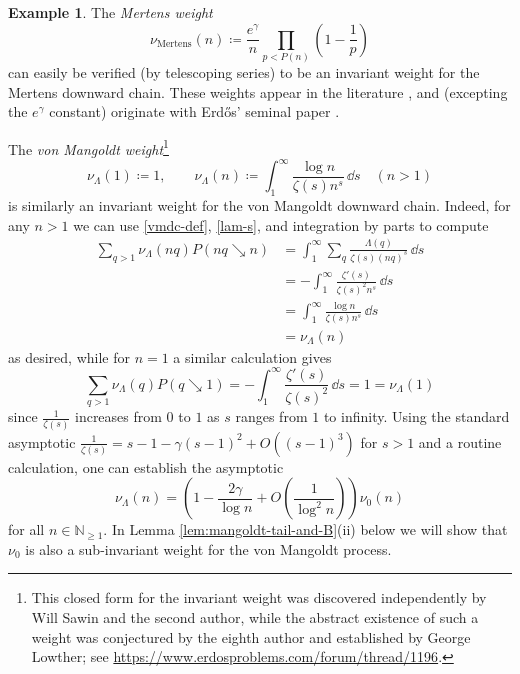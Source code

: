 \documentclass[12pt]{amsart}
\theoremstyle{definition}
\newtheorem{example}[theorem]{Example}
\theoremstyle{remark}
\numberwithin{equation}{section}
\newcommand{\N}{{\mathbb N}}
\newcommand{\nuMangoldt}{\nu_{\Lambda}}
\newcommand{\1}{{\mathbf 1}}
\newcommand{\Erdos}{{Erd\H{o}s}}
\begin{document}
\begin{example}\label{invariants}  The \emph{Mertens weight}
$$ \nu_{\mathrm{Mertens}}(n) \coloneq \frac{e^\gamma}{n} \prod_{p < P(n)} \left(1-\frac{1}{p}\right)$$
can easily be verified (by telescoping series) to be an invariant weight for the Mertens downward chain. These weights appear in the literature \cite{LP, Lichtman, Lalmost,glw}, and (excepting the $e^\gamma$ constant) originate with \Erdos{}' seminal paper \cite{erdos35}.

The \emph{von Mangoldt weight}\footnote{This closed form for the invariant weight was discovered independently by Will Sawin and the second author, while the abstract existence of such a weight was conjectured by the eighth author and established by George Lowther; see \url{https://www.erdosproblems.com/forum/thread/1196}.}
\begin{equation}\label{mang-def}
 \nuMangoldt(1)\coloneq 1,\qquad \nuMangoldt(n) \coloneq \int_1^\infty \frac{\log n}{\zeta(s) n^s}\,\dd s\quad (n>1)
 \end{equation}
is similarly an invariant weight for the von Mangoldt downward chain.  Indeed, for any $n>1$ we can use \eqref{vmdc-def}, \eqref{lam-s}, and integration by parts to compute
\begin{align*}
    \sum_{q > 1} \nuMangoldt(nq) P( nq \searrow n ) 
    &= \int_1^\infty \sum_q \frac{\Lambda(q)}{\zeta(s) (nq)^s}\,\dd s \\
    &= - \int_1^\infty \frac{\zeta'(s)}{\zeta(s)^2 n^s}\,\dd s \\
    &= \int_1^\infty \frac{\log n}{\zeta(s) n^s}\,\dd s \\
    &= \nuMangoldt(n)
\end{align*}
as desired, while for $n=1$ a similar calculation gives
$$     \sum_{q > 1} \nuMangoldt(q) P( q \searrow 1 )  = - \int_1^\infty \frac{\zeta'(s)}{\zeta(s)^2}\,\dd s = 1 = \nuMangoldt(1)$$
since $\frac{1}{\zeta(s)}$ increases from $0$ to $1$ as $s$ ranges from $1$ to infinity.  Using the standard asymptotic $\frac{1}{\zeta(s)} = s-1 - \gamma (s-1)^2 +O((s-1)^3)$ for $s>1$ and a routine calculation, one can establish the asymptotic
\begin{equation}\label{num-asym}
\nuMangoldt(n) = \left(1 - \frac{2\gamma}{\log n} + O\left(\frac{1}{\log^2 n}\right) \right) \nu_0(n)
\end{equation}
for all $n \in \N_{\geq 1}$.  In Lemma \ref{lem:mangoldt-tail-and-B}(ii) below we will show that $\nu_0$ is also a sub-invariant weight for the von Mangoldt process.
\end{example}
\end{document}
